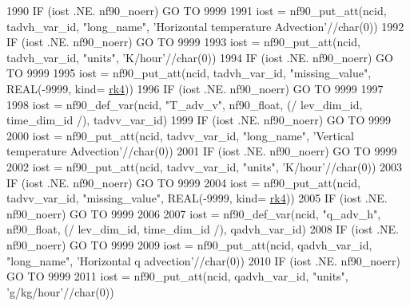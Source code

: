 \begin{DoxyCode}
1990     \textcolor{keywordflow}{IF} (iost .NE. nf90\_noerr) \textcolor{keywordflow}{GO TO} 9999
1991     iost    = nf90\_put\_att(ncid, tadvh\_var\_id, \textcolor{stringliteral}{"long\_name"}, \textcolor{stringliteral}{'Horizontal temperature Advection'}//char(0))
1992     \textcolor{keywordflow}{IF} (iost .NE. nf90\_noerr) \textcolor{keywordflow}{GO TO} 9999
1993     iost    = nf90\_put\_att(ncid, tadvh\_var\_id, \textcolor{stringliteral}{"units"}, \textcolor{stringliteral}{'K/hour'}//char(0))
1994     \textcolor{keywordflow}{IF} (iost .NE. nf90\_noerr) \textcolor{keywordflow}{GO TO} 9999
1995     iost    = nf90\_put\_att(ncid, tadvh\_var\_id, \textcolor{stringliteral}{"missing\_value"}, \textcolor{keywordtype}{REAL}(-9999, kind=
      \hyperlink{namespaceportable_abaed22a509442771d3fba69bebda0b33}{rk4}))
1996     \textcolor{keywordflow}{IF} (iost .NE. nf90\_noerr) \textcolor{keywordflow}{GO TO} 9999
1997 
1998     iost    = nf90\_def\_var(ncid, \textcolor{stringliteral}{"T\_adv\_v"}, nf90\_float, (/ lev\_dim\_id, time\_dim\_id /), tadvv\_var\_id)
1999     \textcolor{keywordflow}{IF} (iost .NE. nf90\_noerr) \textcolor{keywordflow}{GO TO} 9999
2000     iost    = nf90\_put\_att(ncid, tadvv\_var\_id, \textcolor{stringliteral}{"long\_name"}, \textcolor{stringliteral}{'Vertical temperature Advection'}//char(0))
2001     \textcolor{keywordflow}{IF} (iost .NE. nf90\_noerr) \textcolor{keywordflow}{GO TO} 9999
2002     iost    = nf90\_put\_att(ncid, tadvv\_var\_id, \textcolor{stringliteral}{"units"}, \textcolor{stringliteral}{'K/hour'}//char(0))
2003     \textcolor{keywordflow}{IF} (iost .NE. nf90\_noerr) \textcolor{keywordflow}{GO TO} 9999
2004     iost    = nf90\_put\_att(ncid, tadvv\_var\_id, \textcolor{stringliteral}{"missing\_value"}, \textcolor{keywordtype}{REAL}(-9999, kind=
      \hyperlink{namespaceportable_abaed22a509442771d3fba69bebda0b33}{rk4}))
2005     \textcolor{keywordflow}{IF} (iost .NE. nf90\_noerr) \textcolor{keywordflow}{GO TO} 9999
2006 
2007     iost    = nf90\_def\_var(ncid, \textcolor{stringliteral}{"q\_adv\_h"}, nf90\_float, (/ lev\_dim\_id, time\_dim\_id /), qadvh\_var\_id)
2008     \textcolor{keywordflow}{IF} (iost .NE. nf90\_noerr) \textcolor{keywordflow}{GO TO} 9999
2009     iost    = nf90\_put\_att(ncid, qadvh\_var\_id, \textcolor{stringliteral}{"long\_name"}, \textcolor{stringliteral}{'Horizontal q advection'}//char(0))
2010     \textcolor{keywordflow}{IF} (iost .NE. nf90\_noerr) \textcolor{keywordflow}{GO TO} 9999
2011     iost    = nf90\_put\_att(ncid, qadvh\_var\_id, \textcolor{stringliteral}{"units"}, \textcolor{stringliteral}{'g/kg/hour'}//char(0))

\end{DoxyCode}
